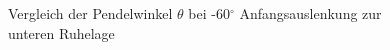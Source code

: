 \begin{figure}[H]
   \centering
   \caption[Vergleich der Pendelwinkel $\theta$ - große Auslenkung]{Vergleich der Pendelwinkel $\theta$ bei -60${^\circ}$ Anfangsauslenkung zur unteren Ruhelage}
   \label{fig:Bild4.5}
\end{figure}